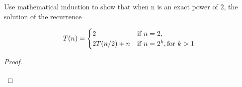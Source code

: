 \documentclass{article}
\begin{document}
Use mathematical induction to show that when n is an exact power of 2, the
solution of the recurrence

\[
{\raggedleft
T(n) = 
  \begin{cases}
    2            & \text{if } n = 2,\\
    2T(n/2) + n  & \text{if } n = 2^k, \text{for } k > 1
  \end{cases}
}
\]

\begin{proof}
\[
\qedhere
\]
\end{proof}
\end{document}
